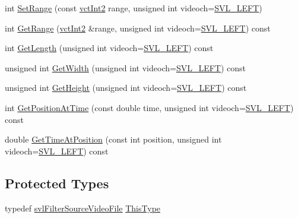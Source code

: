 \begin{DoxyCompactItemize}
\item 
int \hyperlink{classsvl_filter_source_video_file_a658c3b7555b5071933a6a26bc93a42e3}{Set\-Range} (const \hyperlink{vct_fixed_size_vector_types_8h_add8c88eb6a432b15f14b866b9c35325f}{vct\-Int2} range, unsigned int videoch=\hyperlink{svl_definitions_8h_ab9fec7615f19c8df2919eebcab0b187f}{S\-V\-L\-\_\-\-L\-E\-F\-T})
\item 
int \hyperlink{classsvl_filter_source_video_file_a6a19e03fcda1829cf24a47cb53171487}{Get\-Range} (\hyperlink{vct_fixed_size_vector_types_8h_add8c88eb6a432b15f14b866b9c35325f}{vct\-Int2} \&range, unsigned int videoch=\hyperlink{svl_definitions_8h_ab9fec7615f19c8df2919eebcab0b187f}{S\-V\-L\-\_\-\-L\-E\-F\-T}) const 
\item 
int \hyperlink{classsvl_filter_source_video_file_aca502a69e8abf2b6156b7850141fcc42}{Get\-Length} (unsigned int videoch=\hyperlink{svl_definitions_8h_ab9fec7615f19c8df2919eebcab0b187f}{S\-V\-L\-\_\-\-L\-E\-F\-T}) const 
\item 
unsigned int \hyperlink{classsvl_filter_source_video_file_a17c0711b47133030b480af03ec07c219}{Get\-Width} (unsigned int videoch=\hyperlink{svl_definitions_8h_ab9fec7615f19c8df2919eebcab0b187f}{S\-V\-L\-\_\-\-L\-E\-F\-T}) const 
\item 
unsigned int \hyperlink{classsvl_filter_source_video_file_a23da7b7caccb0cbfe05b1c44629ce0ca}{Get\-Height} (unsigned int videoch=\hyperlink{svl_definitions_8h_ab9fec7615f19c8df2919eebcab0b187f}{S\-V\-L\-\_\-\-L\-E\-F\-T}) const 
\item 
int \hyperlink{classsvl_filter_source_video_file_a0f110dd6f47bdb99aff61b5e2df0d506}{Get\-Position\-At\-Time} (const double time, unsigned int videoch=\hyperlink{svl_definitions_8h_ab9fec7615f19c8df2919eebcab0b187f}{S\-V\-L\-\_\-\-L\-E\-F\-T}) const 
\item 
double \hyperlink{classsvl_filter_source_video_file_ae389217965dc7b199eae5fd3794d664a}{Get\-Time\-At\-Position} (const int position, unsigned int videoch=\hyperlink{svl_definitions_8h_ab9fec7615f19c8df2919eebcab0b187f}{S\-V\-L\-\_\-\-L\-E\-F\-T}) const 
\end{DoxyCompactItemize}
\subsection*{Protected Types}
\begin{DoxyCompactItemize}
\item 
typedef \hyperlink{classsvl_filter_source_video_file}{svl\-Filter\-Source\-Video\-File} \hyperlink{classsvl_filter_source_video_file_a64bb04cd76d1088e40860d6f0d2e1897}{This\-Type}
\end{DoxyCompactItemize}
